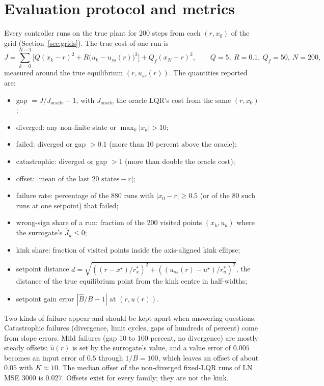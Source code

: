 \documentclass[11pt]{article}
\begin{document}
\section{Evaluation protocol and metrics}\label{sec:eval}

Every controller runs on the true plant for 200 steps from each $(r,x_0)$ of the grid (Section~\ref{sec:grids}). The true cost of one run is
\begin{equation}
J = \sum_{k=0}^{N-1}\Big[Q(x_k-r)^2 + R\big(u_k-u_{ss}(r)\big)^2\Big] + Q_f(x_N-r)^2,\qquad Q=5,\ R=0.1,\ Q_f=50,\ N=200,
\end{equation}
measured around the true equilibrium $(r,u_{ss}(r))$. The quantities reported are:
\begin{itemize}
\item gap $=J/J_{\text{oracle}}-1$, with $J_{\text{oracle}}$ the oracle LQR's cost from the same $(r,x_0)$;
\item diverged: any non-finite state or $\max_k|x_k|>10$;
\item failed: diverged or gap $>0.1$ (more than 10 percent above the oracle);
\item catastrophic: diverged or gap $>1$ (more than double the oracle cost);
\item offset: $|\text{mean of the last 20 states} - r|$;
\item failure rate: percentage of the 880 runs with $|x_0-r|\ge0.5$ (or of the 80 such runs at one setpoint) that failed;
\item wrong-sign share of a run: fraction of the 200 visited points $(x_k,u_k)$ where the surrogate's $\hat J_u\le0$;
\item kink share: fraction of visited points inside the axis-aligned kink ellipse;
\item setpoint distance $d=\sqrt{((r-x^\star)/r^*_x)^2+((u_{ss}(r)-u^\star)/r^*_u)^2}$, the distance of the true equilibrium point from the kink centre in half-widths;
\item setpoint gain error $|\hat B/B-1|$ at $(r,\hat u(r))$.
\end{itemize}
Two kinds of failure appear and should be kept apart when answering questions. Catastrophic failures (divergence, limit cycles, gaps of hundreds of percent) come from slope errors. Mild failures (gap 10 to 100 percent, no divergence) are mostly steady offsets: $\hat u(r)$ is set by the surrogate's value, and a value error of $0.005$ becomes an input error of $0.5$ through $1/B=100$, which leaves an offset of about $0.05$ with $K\approx10$. The median offset of the non-diverged fixed-LQR runs of LN MSE 3000 is 0.027. Offsets exist for every family; they are not the kink.
\end{document}
